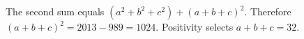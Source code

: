 The second sum equals $(a^2+b^2+c^2)+(a+b+c)^2$. Therefore $(a+b+c)^2=2013-989=1024$. Positivity selects $a+b+c=\boxed{32}$.
